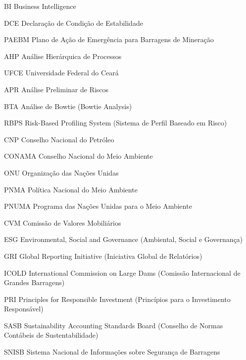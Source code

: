 \begin{siglas}
    \item[BI] Business Intelligence
    \item[DCE] Declaração de Condição de Estabilidade
    \item[PAEBM] Plano de Ação de Emergência para Barragens de Mineração
    \item[AHP] Análise Hierárquica de Processos
    \item[UFCE] Universidade Federal do Ceará
    \item[APR] Análise Preliminar de Riscos
    \item[BTA] Análise de Bowtie (Bowtie Analysis)
    \item[RBPS] Risk-Based Profiling System (Sistema de Perfil Baseado em Risco)
    \item[CNP] Conselho Nacional do Petróleo
    \item[CONAMA] Conselho Nacional do Meio Ambiente
    \item[ONU] Organização das Nações Unidas
    \item[PNMA] Política Nacional do Meio Ambiente
    \item[PNUMA] Programa das Nações Unidas para o Meio Ambiente
    \item[CVM] Comissão de Valores Mobiliários
    \item[ESG] Environmental, Social and Governance (Ambiental, Social e Governança)
    \item[GRI] Global Reporting Initiative (Iniciativa Global de Relatórios)
    \item[ICOLD] International Commission on Large Dams (Comissão Internacional de Grandes Barragens)
    \item[PRI] Principles for Responsible Investment (Princípios para o Investimento Responsável)
    \item[SASB] Sustainability Accounting Standards Board (Conselho de Normas Contábeis de Sustentabilidade)
    \item[SNISB] Sistema Nacional de Informações sobre Segurança de Barragens
\end{siglas}